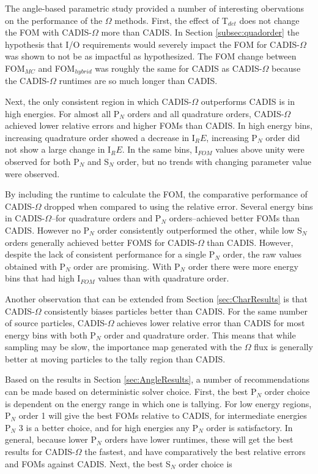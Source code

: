 The angle-based parametric study provided a number of interesting obervations on
the performance of the $\Omega$ methods.
First, the effect of T$_{det}$ does not change the FOM with CADIS-$\Omega$ more
than CADIS. In
Section \ref{subsec:quadorder} the hypothesis that I/O requirements would severely
impact the FOM for CADIS-$\Omega$ was shown to not be as impactful as
hypothesized. The FOM change between
FOM$_{MC}$ and FOM$_{hybrid}$ was roughly the same for CADIS as CADIS-$\Omega$
because the CADIS-$\Omega$ runtimes are so much longer than CADIS.

Next, the only consistent region in which CADIS-$\Omega$ outperforms CADIS is in
high energies. For almost all P$_N$ orders and all quadrature orders, CADIS-$\Omega$
achieved lower relative errors and higher FOMs than CADIS. In high energy bins,
increasing quadrature order showed a decrease in I$_RE$, increasing P$_N$ order
did not show a large change in I$_RE$. In the same bins, I$_{FOM}$ values above
unity were observed for both P$_N$ and S$_N$ order, but no trends with changing
parameter value were observed.

By including the runtime to calculate
the FOM, the comparative performance of CADIS-$\Omega$ dropped when compared to
using the relative error. Several
energy bins in CADIS-$\Omega$--for quadrature orders and
P$_N$ orders--achieved better FOMs than
CADIS. However no P$_N$ order consistently outperformed the other, while low
S$_N$ orders generally achieved better FOMS for CADIS-$\Omega$ than CADIS.
However, despite the lack of consistent performance for a single P$_N$ order,
the raw values obtained with P$_N$ order are promising. With P$_N$ order
there were more energy bins that had high I$_{FOM}$ values than with quadrature
order.

Another observation that can be extended from Section \ref{sec:CharResults} is
that CADIS-$\Omega$ consistently biases
particles better than CADIS. For the same number of source particles,
CADIS-$\Omega$
achieves lower relative error than CADIS for most energy bins with both P$_N$
order and quadrature order. This means that while sampling may be slow, the
importance map generated with the $\Omega$ flux is generally
better at moving particles to the tally region than
CADIS.

Based on the results in Section \ref{sec:AngleResults}, a number of
recommendations can be made based on deterministic solver choice. First, the
best P$_N$ order choice is
dependent on the energy range in which one is tallying. For low energy regions,
P$_N$ order 1 will give the best FOMs relative to CADIS, for intermediate
energies P$_N$ 3 is a better choice, and for high energies any P$_N$ order is
satisfactory. In general, because lower P$_N$ orders have lower runtimes, these
will get the best results for CADIS-$\Omega$ the fastest, and have comparatively
the best relative errors and FOMs against CADIS. Next, the best S$_N$ order
choice is

